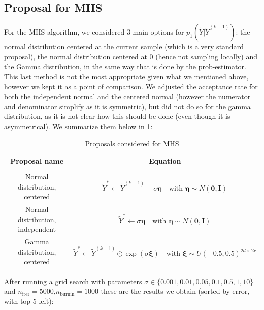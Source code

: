 \documentclass[12pt]{memoir}
\newcommand{\mb}{\mathbf}
\newcommand{\nitern}[1]{$n_{\text{iter}}=#1$}
\newcommand{\nburninn}[1]{$n_{\text{burnin}}=#1$}
\begin{document}
\subsection*{Proposal for MHS}
For the MHS algorithm, we considered 3 main options for $p_1(\tilde Y| \tilde Y ^{(k-1)})$: the normal distribution centered at the current sample (which is a very standard proposal), the normal distribution centered at 0 (hence not sampling locally) and the Gamma distribution, in the same way that is done by the prob-estimator. This last method is not the most appropriate given what we mentioned above, however we kept it as a point of comparison. We adjusted the acceptance rate for both the independent normal and the centered normal (however the numerator and denominator simplify as it is symmetric), but did not do so for the gamma distribution, as it is not clear how this should be done (even though it is asymmetrical). We summarize them below in \ref{table:proposal-comp-mhs}:
\begin{table}[H]

    \begin{center}
        \begin{tabular}{|c|c|}
            \hline
            Proposal name & Equation\\
            \hline\hline
             & \\[-10pt]
            Normal distribution, centered & $\tilde Y^* \gets \tilde Y^{(k-1)} + \sigma \boldsymbol{\eta} \quad\text{with } \boldsymbol{\eta} \sim N(\mb 0, \mb I)$\\
            Normal distribution, independent & $\tilde Y^* \gets \sigma \boldsymbol{\eta} \quad\text{with } \boldsymbol{\eta} \sim N(\mb 0, \mb I)$\\
            Gamma distribution, centered & $\tilde Y^* \gets \tilde Y^{(k-1)} \odot \exp (\sigma\boldsymbol{\xi})\quad \text{with } \boldsymbol{\xi} \sim U(-0.5, 0.5)^{2d\times 2r}$\\\hline
        \end{tabular}
\end{center}
\caption{Proposals considered for MHS}
\label{table:proposal-comp-mhs}
\end{table}

After running a grid search with parameters $\sigma\in \{0.001, 0.01, 0.05, 0.1, 0.5, 1, 10\}$ and \nitern{5000},\nburninn{1000} these are the results we obtain (sorted by error, with top 5 left): 
\end{document}
